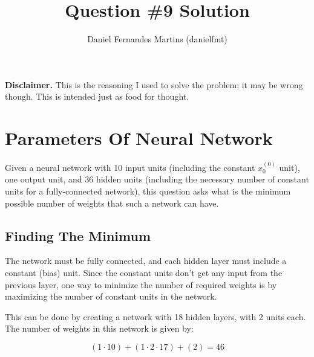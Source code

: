 \documentclass{article}
\author{Daniel Fernandes Martins (danielfmt)}
\title{Question \#9 Solution}
\begin{document}
\maketitle

\textbf{Disclaimer.} This is the reasoning I used to solve the problem; it
may be wrong though. This is intended just as food for thought.

\section{Parameters Of Neural Network}

Given a neural network with 10 input units (including the constant $x_0^{(0)}$
unit), one output unit, and 36 hidden units (including the necessary number of
constant units for a fully-connected network), this question asks what is the
minimum possible number of weights that such a network can have.

\subsection{Finding The Minimum}

The network must be fully connected, and each hidden layer must include a
constant (bias) unit. Since the constant units don't get any input from the
previous layer, one way to minimize the number of required weights is by
maximizing the number of constant units in the network.

This can be done by creating a network with 18 hidden layers, with 2 units each.
The number of weights in this network is given by:

\begin{equation*}
(1 \cdot 10) + (1 \cdot 2 \cdot 17) + (2) = 46
\end{equation*}
\end{document}
